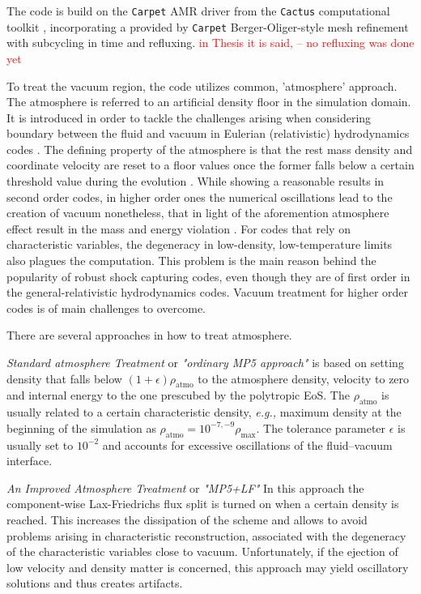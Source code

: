 The code is build on the \texttt{Carpet} AMR driver \cite{Schnetter:2003rb} from the \texttt{Cactus} computational toolkit \cite{Goodale:2003}, incorporating a provided by \texttt{Carpet} Berger-Oliger-style mesh refinement \cite{Berger:1989,Berger:1984} with subcycling in time and refluxing. \textcolor{red}{in Thesis it is said, -- no refluxing was done yet}

To treat the vacuum region, the code utilizes common, 'atmosphere' approach. The atmosphere is referred to an artificial density floor in the simulation domain. It is introduced in order to tackle the challenges arising when considering boundary between the fluid and vacuum in Eulerian (relativistic) hydrodynamics codes \cite{Galeazzi:mThesis:2008,Kastaun:2006,Millmore:2009dk}. 
The defining property of the atmosphere is that the rest mass density and coordinate velocity are reset to a floor values once the former falls below a certain threshold value during the evolution \cite{Font:2001ew,Baiotti:2004wn}. While showing a reasonable results in second order codes, in higher order ones the numerical oscillations lead to the creation of vacuum nonetheless, that in light of the aforemention atmosphere effect result in the mass and energy violation \cite{Radice:2011qr}. For codes that rely on characteristic variables, the degeneracy in low-density, low-temperature limits also plagues the computation. This problem is the main reason behind the popularity of robust shock capturing codes, even though they are of first order in the general-relativistic hydrodynamics codes. Vacuum treatment for higher order codes is of main challenges to overcome.

There are several approaches in how to treat atmosphere. 

\textit{Standard atmosphere Treatment} or \textit{"ordinary MP5 approach"} is based on setting density that falls below $(1+\epsilon)\rho_{\text{atmo}}$ to the atmosphere density, velocity to zero and internal energy to the one prescubed by the polytropic EoS. The $\rho_{\text{atmo}}$ is usually related to a certain characteristic density, \textit{e.g.,} maximum density at the beginning of the simulation as $\rho_{\text{atmo}} = 10^{-7,-9}\rho_{\text{max}}$. The tolerance parameter $\epsilon$ is usually set to $10^{-2}$ and accounts for excessive oscillations of the fluid–vacuum interface. 

\textit{An Improved Atmosphere Treatment} or \textit{"MP5+LF"} In this approach the component-wise Lax-Friedrichs flux split is turned on when a certain density is reached. This increases the dissipation of the scheme and allows to avoid problems arising in characteristic reconstruction, associated with the degeneracy of the characteristic variables close to vacuum. Unfortunately, if the ejection of low velocity and density matter is concerned, this approach may yield oscillatory solutions and thus creates artifacts. 

